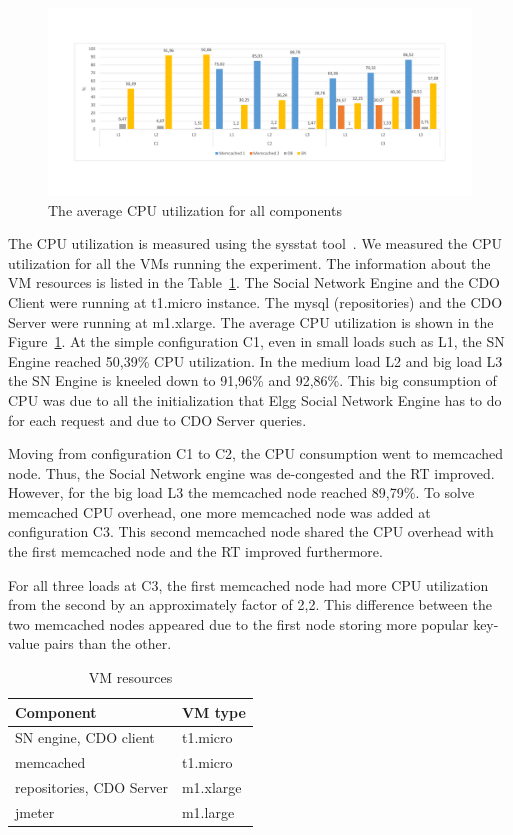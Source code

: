 \begin{figure}[h]
	\centering
	\includegraphics[width=1.1\textwidth,natwidth=200,natheight=250]{./fig/UsageAVG.pdf} 
	\caption{The average CPU utilization for all components}
	\label{fig:cpuavg}
\end{figure}

The CPU utilization is measured using the sysstat tool~\cite{sysstat_url}. We measured the CPU utilization for all the VMs running the experiment. The information about the VM resources is listed in the Table~\ref{vms_resources}. The Social Network Engine and the CDO Client were running at t1.micro instance. The mysql (repositories) and the CDO Server were running at m1.xlarge. The average CPU utilization is shown in the Figure~\ref{fig:cpuavg}. At the simple configuration C1, even in small loads such as L1, the SN Engine reached 50,39\% CPU utilization. In the medium load L2 and big load L3 the SN Engine is kneeled down to 91,96\% and 92,86\%. This big consumption of CPU was due to all the initialization that Elgg Social Network Engine has to do for each request and due to CDO Server queries.

Moving from configuration C1 to C2, the CPU consumption went to memcached node. Thus, the Social Network engine was de-congested and the RT improved. However, for the big load L3 the memcached node reached 89,79\%. To solve memcached CPU overhead, one more memcached node was added at configuration C3. This second memcached node shared the CPU overhead with the first memcached node and the RT improved furthermore. 

For all three loads at C3, the first memcached node had more CPU utilization from the second by an approximately factor of 2,2. This difference between the two memcached nodes appeared due to the first node storing more popular key-value pairs than the other.

\begin{table}[]
\centering
\begin{tabular}{|l|l|}
\hline
 Component &  VM type \\ \hline
 SN engine, CDO client &  t1.micro \\ \hline
 memcached &  t1.micro \\ \hline
 repositories, CDO Server &  m1.xlarge \\ \hline
 jmeter &  m1.large \\ \hline
\end{tabular}
\caption{VM resources}
\label{vms_resources}
\end{table}

